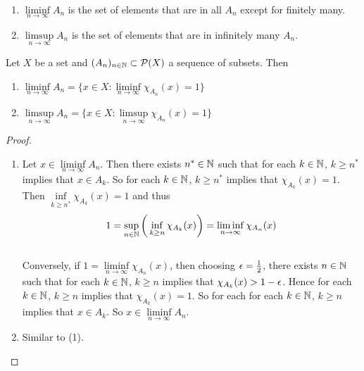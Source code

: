 \documentclass{book}
\begin{document}
	\begin{note}\
		\begin{enumerate}
			\item $\liminf\limits_{n \rightarrow \infty} A_n$ is the set of elements that are in all $A_n$ except for finitely many. 
			
			\item $\limsup\limits_{n \rightarrow \infty} A_n$ is the set of elements that are in infinitely many $A_n$.
		\end{enumerate}
	\end{note}
	
	\begin{ex}  
		Let $X$ be a set and $(A_n)_{n \in \mathbb{N}} \subset \mathcal{P}(X)$ a sequence of subsets. Then 
		\begin{enumerate}
			\item $\liminf\limits_{n \rightarrow \infty}A_n = \bigg \{x \in X: \liminf\limits_{n \rightarrow \infty}\chi_{A_n}(x) = 1\bigg\}$
			\item $\limsup\limits_{n \rightarrow \infty}A_n = \bigg \{x \in X: \limsup\limits_{n \rightarrow \infty}\chi_{A_n}(x) = 1\bigg\}$
		\end{enumerate}
	\end{ex}
	
	\begin{proof}\
		\begin{enumerate}
			\item Let $x \in \liminf\limits_{n \rightarrow \infty}A_n$. Then there exists $n^* \in \mathbb{N}$ such that for each $k \in \mathbb{N}$, $k \geq n^*$ implies that $x \in A_k$. So for each $k \in \mathbb{N}$, $k \geq n^*$ implies that $\chi_{A_k}(x) = 1$. Then $\inf\limits_{k \geq n^*}\chi_{A_k}(x) = 1$ and thus $$1 = \sup\limits_{n \in \mathbb{N}} \bigg(\inf\limits_{k \geq n} \chi_{A_k}(x) \bigg) = \liminf_{n \rightarrow \infty}\chi_{A_n}(x)$$ \vspace{3mm} \\
			Conversely, if $1 = \liminf\limits_{n \rightarrow \infty}\chi_{A_n}(x)$, then choosing $\epsilon = \frac{1}{2}$, there exists $n \in \mathbb{N}$ such that for each $k \in \mathbb{N}$, $k \geq n$ implies that $\chi_{A_k}(x) > 1-\epsilon$. Hence for each $k \in \mathbb{N}$, $k \geq n$ implies that $\chi_{A_k}(x) = 1$. So for each for each $k \in \mathbb{N}$, $k \geq n$ implies that $x \in A_k$. So $x \in \liminf\limits_{n \rightarrow \infty} A_n$. 
			\item Similar to (1).
		\end{enumerate}
	\end{proof}
	
\end{document}
